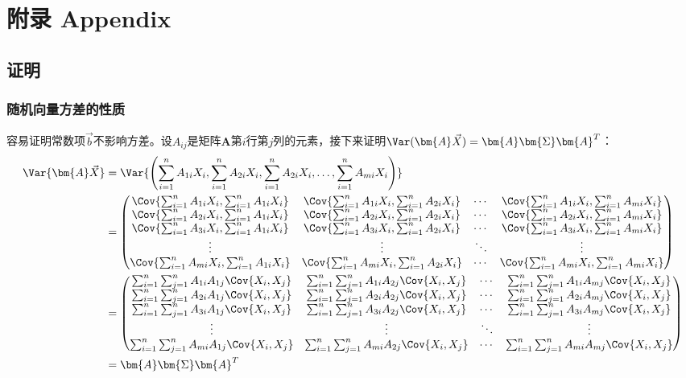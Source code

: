 \documentclass{MGLSA-cn-book-math}
\begin{document}
\chapter{附录 Appendix}
\section{证明}
\subsection{随机向量方差的性质}
\label{proof:vector-var-prop}
容易证明常数项$\vec{b}$不影响方差。设$A_{ij}$是矩阵$\bm{A}$第$i$行第$j$列的元素，接下来证明$\Var (\bm{A}\vec{X})=\bm{A}\bm{\Sigma}\bm{A}^T$：
\begin{align*}
	\Var{\bm{A}\vec{X}}&=\Var{\left(\sum_{i=1}^nA_{1i}X_i, \sum_{i=1}^nA_{2i}X_i,\sum_{i=1}^nA_{2i}X_i, \dots, \sum_{i=1}^nA_{mi}X_i\right)} \\
	&=\begin{pmatrix}
		\Cov {\sum_{i=1}^nA_{1i}X_i, \sum_{i=1}^nA_{1i}X_i} & \Cov{\sum_{i=1}^nA_{1i}X_i, \sum_{i=1}^nA_{2i}X_i} & \cdots & \Cov{\sum_{i=1}^nA_{1i}X_i, \sum_{i=1}^nA_{mi}X_i} \\
		\Cov{\sum_{i=1}^nA_{2i}X_i, \sum_{i=1}^nA_{1i}X_i} & \Cov{\sum_{i=1}^nA_{2i}X_i, \sum_{i=1}^nA_{2i}X_i} & \cdots & \Cov{\sum_{i=1}^nA_{2i}X_i, \sum_{i=1}^nA_{mi}X_i} \\
		\Cov{\sum_{i=1}^nA_{3i}X_i, \sum_{i=1}^nA_{1i}X_i} & \Cov{\sum_{i=1}^nA_{3i}X_i, \sum_{i=1}^nA_{2i}X_i} & \cdots & \Cov{\sum_{i=1}^nA_{3i}X_i, \sum_{i=1}^nA_{mi}X_i} \\
		\vdots & \vdots & \ddots & \vdots \\
		\Cov{\sum_{i=1}^nA_{mi}X_i, \sum_{i=1}^nA_{1i}X_i} & \Cov{\sum_{i=1}^nA_{mi}X_i, \sum_{i=1}^nA_{2i}X_i} & \cdots & \Cov{\sum_{i=1}^nA_{mi}X_i, \sum_{i=1}^nA_{mi}X_i}
	\end{pmatrix} \\
	&=\begin{pmatrix}
		\sum_{i=1}^n\sum_{j=1}^nA_{1i}A_{1j}\Cov{X_i, X_j} & \sum_{i=1}^n\sum_{j=1}^nA_{1i}A_{2j}\Cov{X_i, X_j} & \cdots & \sum_{i=1}^n\sum_{j=1}^nA_{1i}A_{mj}\Cov{X_i, X_j} \\
		\sum_{i=1}^n\sum_{j=1}^nA_{2i}A_{1j}\Cov{X_i, X_j} & \sum_{i=1}^n\sum_{j=1}^nA_{2i}A_{2j}\Cov{X_i, X_j} & \cdots & \sum_{i=1}^n\sum_{j=1}^nA_{2i}A_{mj}\Cov{X_i, X_j} \\
		\sum_{i=1}^n\sum_{j=1}^nA_{3i}A_{1j}\Cov{X_i, X_j} & \sum_{i=1}^n\sum_{j=1}^nA_{3i}A_{2j}\Cov{X_i, X_j} & \cdots & \sum_{i=1}^n\sum_{j=1}^nA_{3i}A_{mj}\Cov{X_i, X_j} \\
		\vdots & \vdots & \ddots & \vdots \\
		\sum_{i=1}^n\sum_{j=1}^nA_{mi}A_{1j}\Cov{X_i, X_j} & \sum_{i=1}^n\sum_{j=1}^nA_{mi}A_{2j}\Cov{X_i, X_j} & \cdots & \sum_{i=1}^n\sum_{j=1}^nA_{mi}A_{mj}\Cov{X_i, X_j}
	\end{pmatrix} \\
	&=\bm{A}\bm{\Sigma}\bm{A}^T
\end{align*}
\end{document}
